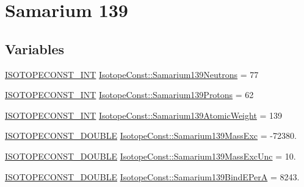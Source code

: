 \hypertarget{group___isotope_const-_samarium-_sm139}{}\section{Samarium 139}
\label{group___isotope_const-_samarium-_sm139}
\subsection*{Variables}
\begin{DoxyCompactItemize}
\item 
\mbox{\hyperlink{group___isotope_const-_macros_ga5f18360b3e99483a35c32d789e62621c}{I\+S\+O\+T\+O\+P\+E\+C\+O\+N\+S\+T\+\_\+\+I\+NT}} \mbox{\hyperlink{group___isotope_const-_samarium-_sm139_ga4d2e2a5406d1f5830327fa0d294f64d5}{Isotope\+Const\+::\+Samarium139\+Neutrons}} = 77
\item 
\mbox{\hyperlink{group___isotope_const-_macros_ga5f18360b3e99483a35c32d789e62621c}{I\+S\+O\+T\+O\+P\+E\+C\+O\+N\+S\+T\+\_\+\+I\+NT}} \mbox{\hyperlink{group___isotope_const-_samarium-_sm139_ga4828f868aee3c187ca17f6f7ba55a00a}{Isotope\+Const\+::\+Samarium139\+Protons}} = 62
\item 
\mbox{\hyperlink{group___isotope_const-_macros_ga5f18360b3e99483a35c32d789e62621c}{I\+S\+O\+T\+O\+P\+E\+C\+O\+N\+S\+T\+\_\+\+I\+NT}} \mbox{\hyperlink{group___isotope_const-_samarium-_sm139_gac2e6acd9587fff3cb66e34e433f93ee9}{Isotope\+Const\+::\+Samarium139\+Atomic\+Weight}} = 139
\item 
\mbox{\hyperlink{group___isotope_const-_macros_ga8f45a7272ce02c0b4c65c44636ed719a}{I\+S\+O\+T\+O\+P\+E\+C\+O\+N\+S\+T\+\_\+\+D\+O\+U\+B\+LE}} \mbox{\hyperlink{group___isotope_const-_samarium-_sm139_gabee4b018dfda8b0a4a524c06b18a18ab}{Isotope\+Const\+::\+Samarium139\+Mass\+Exc}} = -\/72380.
\item 
\mbox{\hyperlink{group___isotope_const-_macros_ga8f45a7272ce02c0b4c65c44636ed719a}{I\+S\+O\+T\+O\+P\+E\+C\+O\+N\+S\+T\+\_\+\+D\+O\+U\+B\+LE}} \mbox{\hyperlink{group___isotope_const-_samarium-_sm139_ga2f186689681c9220be45315edbf5f3ba}{Isotope\+Const\+::\+Samarium139\+Mass\+Exc\+Unc}} = 10.
\item 
\mbox{\hyperlink{group___isotope_const-_macros_ga8f45a7272ce02c0b4c65c44636ed719a}{I\+S\+O\+T\+O\+P\+E\+C\+O\+N\+S\+T\+\_\+\+D\+O\+U\+B\+LE}} \mbox{\hyperlink{group___isotope_const-_samarium-_sm139_gaa087f9537adb05db2b60a4160c28f02b}{Isotope\+Const\+::\+Samarium139\+Bind\+E\+PerA}} = 8243.
\item 

\end{DoxyCompactItemize}
